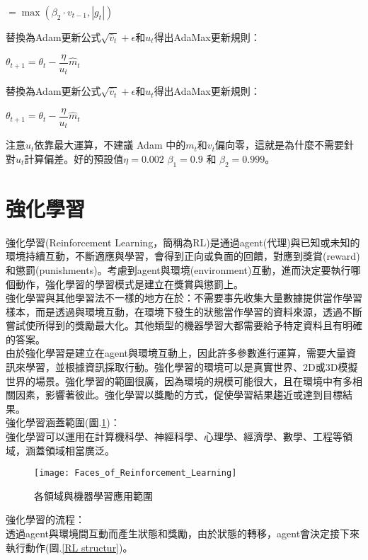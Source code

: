 \begin{itemize}
\begin{center}
$= \max(\beta_2 \cdot v_{t-1}, |g_t|)$
\end{center}
替換為Adam更新公式$\sqrt{\hat{v}_t} + \epsilon$和$u_t$得出AdaMax更新規則：
\begin{center}
$\theta_{t+1} = \theta_{t} - \dfrac{\eta}{u_t} \hat{m}_t$
\end{center}
替換為Adam更新公式$\sqrt{\hat{v}_t} + \epsilon$和$u_t$得出AdaMax更新規則：
\begin{center}
$\theta_{t+1} = \theta_{t} - \dfrac{\eta}{u_t} \hat{m}_t$
\end{center}
注意$u_t$依靠最大運算，不建議 Adam 中的$m_t$和$v_t$偏向零，這就是為什麼不需要針對$u_t$計算偏差。好的預設值$\eta = 0.002$ $\beta_1 = 0.9$ 和 $\beta_2 = 0.999$。

\end{itemize}
\newpage
\section{強化學習}
強化學習(Reinforcement Learning，簡稱為RL)是通過agent(代理)與已知或未知的環境持續互動，不斷適應與學習，會得到正向或負面的回饋，對應到獎賞(reward)和懲罰(punishments)。考慮到agent與環境(environment)互動，進而決定要執行哪個動作，強化學習的學習模式是建立在獎賞與懲罰上。\\
 強化學習與其他學習法不一樣的地方在於：不需要事先收集大量數據提供當作學習樣本，而是透過與環境互動，在環境下發生的狀態當作學習的資料來源，透過不斷嘗試使所得到的獎勵最大化。其他類型的機器學習大都需要給予特定資料且有明確的答案。\\
 由於強化學習是建立在agent與環境互動上，因此許多參數進行運算，需要大量資訊來學習，並根據資訊採取行動。強化學習的環境可以是真實世界、2D或3D模擬世界的場景。強化學習的範圍很廣，因為環境的規模可能很大，且在環境中有多相關因素，影響著彼此。強化學習以獎勵的方式，促使學習結果趨近或達到目標結果。\\

\newpage
強化學習涵蓋範圍(圖.\ref{各領域與機器學習應用範圍})：\\
 強化學習可以運用在計算機科學、神經科學、心理學、經濟學、數學、工程等領域，涵蓋領域相當廣泛。
\begin{figure}[hbt!]
\begin{center}
\texttt{[image: Faces\_of\_Reinforcement\_Learning]}
\caption{\Large 各領域與機器學習應用範圍}
\label{各領域與機器學習應用範圍}
\end{center}
\end{figure}
\newpage
強化學習的流程：\\
透過agent與環境間互動而產生狀態和獎勵，由於狀態的轉移，agent會決定接下來執行動作(圖.\ref{RL structur})。\\[12pt]

